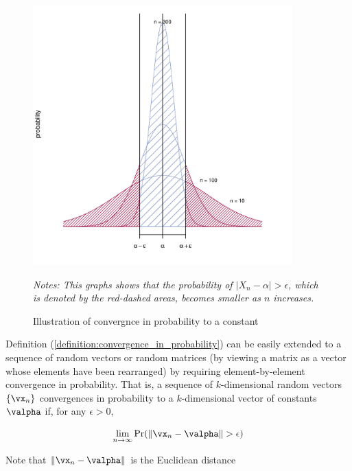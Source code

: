 \begin{figure}[ht]
  \caption{Illustration of convergnce in probability to a constant}
    \label{fig:convinprob}
    \centering
    \begin{minipage}{.9\linewidth}
\begin{knitrout}
\color{fgcolor}

{\centering \includegraphics[width=10cm,height=10cm]{figure/convinprob-1} 

}


\end{knitrout}
\footnotesize
		\emph{Notes: This graphs shows that the probability of $\left|X_n-\alpha\right|>\epsilon$, which is denoted by the red-dashed areas, becomes smaller as $n$ increases. }
	\end{minipage}
\end{figure}

Definition (\ref{definition:convergence_in_probability}) can be easily extended to a sequence of random vectors or random matrices (by viewing a matrix as a vector whose elements have been rearranged) by requiring element-by-element convergence in probability. That is, a sequence of $k$-dimensional random vectors $\left\{\vx_n\right\}$ convergences in probability to a $k$-dimensional vector of constants $\valpha$ if, for any $\epsilon>0$,

\begin{equation*}
\lim_{n\to \infty} \Pr(\left\lVert\vx_{n}-\valpha\right\rVert>\epsilon)
\end{equation*}

Note that $\left\| \vx_n - \valpha\right\| $ is the Euclidean distance 

